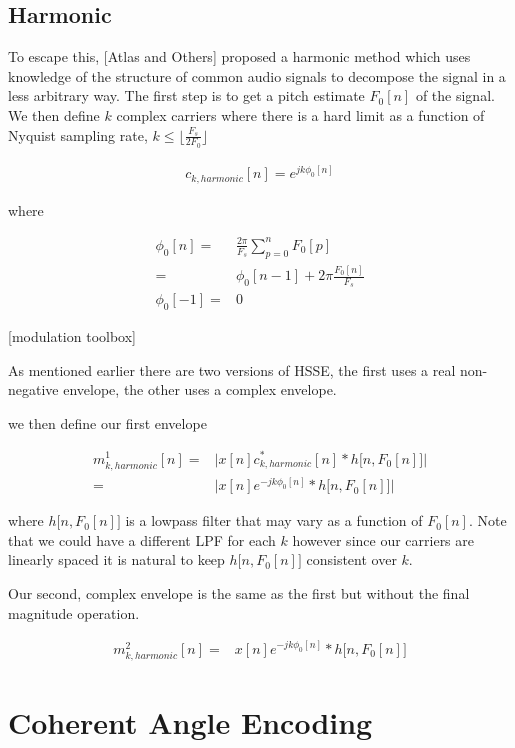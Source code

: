 \documentclass [11pt, proquest] {uwthesis}[2015/03/03]
\begin{document}
\subsection{Harmonic}

To escape this, [Atlas and Others] proposed a harmonic method which uses knowledge of the structure of common audio signals to decompose the signal in a less arbitrary way.  The first step is to get a pitch estimate $F_0[n]$ of the signal.  We then define $k$ complex carriers where there is a hard limit as a function of Nyquist sampling rate, $k \leq  \lfloor \frac{F_s}{2F_0} \rfloor$

\begin{align}
c_{k,harmonic}[n] = e^{jk\phi_0 [n]}
\end{align}

where 

\begin{align}
\phi_0[n] =& \frac{2\pi}{F_s} \sum_{p=0}^{n} F_0[p] \nonumber \\
=& \phi_0[n - 1] + 2\pi \frac{F_0[n]}{F_s} \\
\phi_0[-1] =& 0 \nonumber
\end{align}

[modulation toolbox]

As mentioned earlier there are two versions of HSSE, the first uses a real non-negative envelope, the other uses a complex envelope.

we then define our first envelope

\begin{align}
m^1_{k,harmonic}[n] =& \Big| x[n] c_{k,harmonic}^*[n] * h\big[n, F_0[n] \big] \Big| \nonumber \\
=& \Big| x[n] e^{-jk\phi_0 [n]} * h\big[n, F_0[n] \big] \Big|
\end{align}

where $h\big[n, F_0[n] \big]$ is a lowpass filter that may vary as a function of $F_0[n]$.  Note that we could have a different LPF for each $k$ however since our carriers are linearly spaced it is natural to keep $h\big[n, F_0[n] \big]$ consistent over $k$.

Our second, complex envelope is the same as the first but without the final magnitude operation.

\begin{align}
m^2_{k,harmonic}[n] =& x[n] e^{-jk\phi_0 [n]} * h\big[n, F_0[n] \big]
\end{align}

\section{Coherent Angle Encoding}
\end{document}
